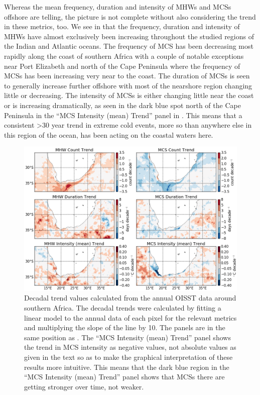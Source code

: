 \documentclass[a4paper,10pt,review]{elsarticle}
\begin{document}
Whereas the mean frequency, duration and intensity of MHWs and MCSs offshore are telling, the picture is not complete without also considering the trend in these metrics, too. We see in  that the frequency, duration and intensity of MHWs have almost exclusively been increasing throughout the studied regions of the Indian and Atlantic oceans. The frequency of MCS has been decreasing most rapidly along the coast of southern Africa with a couple of notable exceptions near Port Elizabeth and north of the Cape Peninsula where the frequency of MCSs has been increasing very near to the coast. The duration of MCSs is seen to generally increase further offshore with most of the nearshore region changing little or decreasing. The intensity of MCSs is either changing little near the coast or is increasing dramatically, as seen in the dark blue spot north of the Cape Peninsula in the ``MCS Intensity (mean) Trend'' panel in . This means that a consistent >30 year trend in extreme cold events, more so than anywhere else in this region of the ocean, has been acting on the coastal waters here.

\begin{figure}
\centering \includegraphics[width=1.0\textwidth]{MHW_MCS_trend.png}
\caption{Decadal trend values calculated from the annual OISST data around southern Africa. The decadal trends were calculated by fitting a linear model to the annual data of each pixel for the relevant metrics and multiplying the slope of the line by 10. The panels are in the same position as . The ``MCS Intensity (mean) Trend'' panel shows the trend in MCS intensity as negative values, not absolute values as given in the text so as to make the graphical interpretation of these results more intuitive. This means that the dark blue region in the ``MCS Intensity (mean) Trend'' panel shows that MCSs there are getting stronger over time, not weaker.}
\label{fig:Figure7}
\end{figure}
\end{document}
